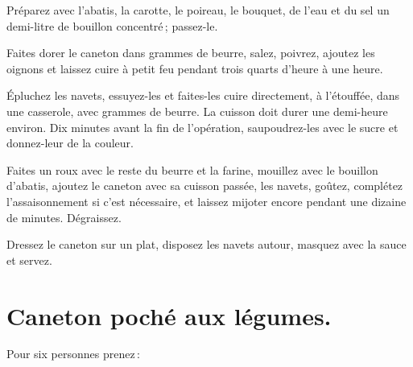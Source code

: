 Préparez avec l'abatis, la carotte, le poireau, le bouquet, de l'eau et du sel
un demi-litre de bouillon concentré ; passez-le.

Faites dorer le caneton dans {\mmm} grammes de beurre, salez, poivrez, ajoutez les
oignons et laissez cuire à petit feu pendant trois quarts d'heure à une heure.

Épluchez les navets, essuyez-les et faites-les cuire directement, à l’étouffée,
dans une casserole, avec {\mmm} grammes de beurre. La cuisson doit durer une
demi-heure environ. Dix minutes avant la fin de l'opération, saupoudrez-les
avec le sucre et donnez-leur de la couleur.

Faites un roux avec le reste du beurre et la farine, mouillez avec le bouillon
d'abatis, ajoutez le caneton avec sa cuisson passée, les navets, goûtez,
complétez l’assaisonnement si c'est nécessaire, et laissez mijoter encore
pendant une dizaine de minutes. Dégraissez.

Dressez le caneton sur un plat, disposez les navets autour, masquez avec la
sauce et servez.

\section*{\centering Caneton poché aux légumes.}
{}

Pour six personnes prenez :

\medskip

